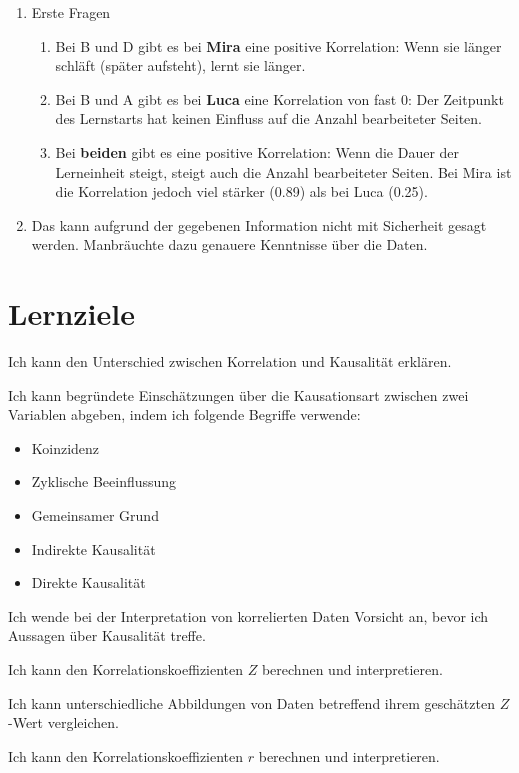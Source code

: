 \begin{myexercise}
    \begin{myanswer}
        \begin{enumerate}
            \item Erste Fragen
                  \begin{enumerate}
                      \item Bei B und D gibt es bei \textbf{Mira} eine positive Korrelation: Wenn sie länger schläft (später aufsteht), lernt sie länger.
                      \item Bei B und A gibt es bei \textbf{Luca} eine Korrelation von fast 0: Der Zeitpunkt des Lernstarts hat keinen Einfluss auf die Anzahl bearbeiteter Seiten.
                      \item Bei \textbf{beiden} gibt es eine positive Korrelation: Wenn die Dauer der Lerneinheit steigt, steigt auch die Anzahl bearbeiteter Seiten. Bei Mira ist die Korrelation jedoch viel stärker (0.89) als bei Luca (0.25).
                  \end{enumerate}
            \item Das kann aufgrund der gegebenen Information nicht mit Sicherheit gesagt werden. Manbräuchte dazu genauere Kenntnisse über die Daten.
        \end{enumerate}
    \end{myanswer}
\end{myexercise}

\clearpage
\section{Lernziele}
\begin{todolist}
    \item Ich kann den Unterschied zwischen Korrelation und Kausalität erklären.
    \item Ich kann begründete Einschätzungen über die Kausationsart zwischen zwei Variablen abgeben, indem ich folgende Begriffe verwende:
    \begin{itemize}
        \item Koinzidenz
        \item Zyklische Beeinflussung
        \item Gemeinsamer Grund
        \item Indirekte Kausalität
        \item Direkte Kausalität
    \end{itemize}
    \item Ich wende bei der Interpretation von korrelierten Daten Vorsicht an, bevor ich Aussagen über Kausalität treffe.
    \item Ich kann den Korrelationskoeffizienten \( Z \) berechnen und interpretieren.
    \item Ich kann unterschiedliche Abbildungen von Daten betreffend ihrem geschätzten \(Z\)-Wert vergleichen.
    \item Ich kann den Korrelationskoeffizienten \( r \) berechnen und interpretieren.
\end{todolist}